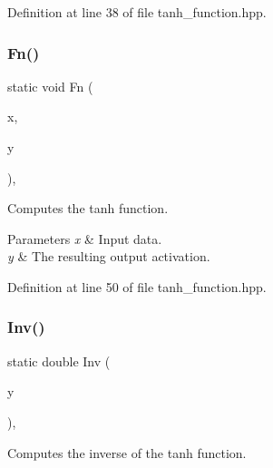 Definition at line 38 of file tanh\+\_\+function.\+hpp.

\mbox{\label{classmlpack_1_1ann_1_1TanhFunction_af6cf5da90eb6312e3e25c9b8bd9c3527}} 
\subsubsection{Fn()\hspace{0.1cm}{\footnotesize\ttfamily [2/2]}}
{\footnotesize\ttfamily static void Fn (\begin{DoxyParamCaption}\item[{const Input\+Vec\+Type \&}]{x,  }\item[{Output\+Vec\+Type \&}]{y }\end{DoxyParamCaption})\hspace{0.3cm}{\ttfamily [inline]}, {\ttfamily [static]}}



Computes the tanh function. 


\begin{DoxyParams}{Parameters}
{\em x} & Input data. \\
\hline
{\em y} & The resulting output activation. \\
\hline
\end{DoxyParams}


Definition at line 50 of file tanh\+\_\+function.\+hpp.

\mbox{\label{classmlpack_1_1ann_1_1TanhFunction_a32d503b167c9646569a202e8c134ef76}} 
\subsubsection{Inv()\hspace{0.1cm}{\footnotesize\ttfamily [1/2]}}
{\footnotesize\ttfamily static double Inv (\begin{DoxyParamCaption}\item[{const double}]{y }\end{DoxyParamCaption})\hspace{0.3cm}{\ttfamily [inline]}, {\ttfamily [static]}}



Computes the inverse of the tanh function. 


